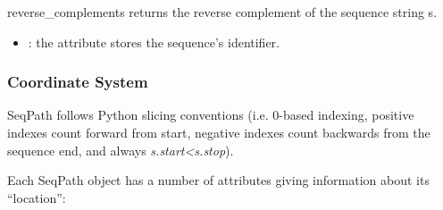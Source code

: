 \documentclass{howto}
\begin{document}
\begin{funcdesc}{reverse_complement}{s}
  returns the reverse complement of the sequence string s.
\end{funcdesc}


\begin{itemize}
\item
{}: the  attribute stores the sequence's identifier.

\end{itemize}

\subsubsection{Coordinate System}
SeqPath follows Python slicing conventions (i.e. 0-based indexing, positive indexes
count forward from start, negative indexes count backwards from the sequence
end, and always {\em s.start<s.stop}).

Each SeqPath object has a number of attributes giving information about its
``location'':
\end{document}
